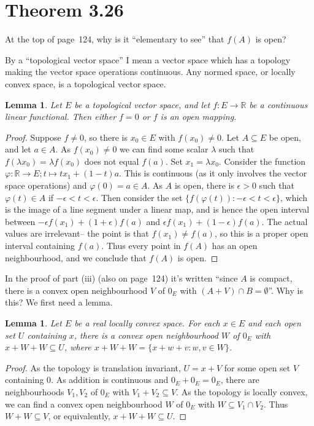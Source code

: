 \documentclass[twoside,12pt,a4paper]{article}
\theoremstyle{plain}
\newtheorem{lemma}[proposition]{Lemma}
\theoremstyle{definition}
\begin{document}

\section{Theorem 3.26}

At the top of page~124, why is it ``elementary to see'' that $f(A)$ is open?

By a ``topological vector space'' I mean a vector space which has a topology making
the vector space operations continuous.  Any normed space, or locally convex space,
is a topological vector space.

\begin{lemma}
Let $E$ be a topological vector space, and let $f:E\rightarrow\mathbb R$ be a
continuous linear functional.  Then either $f=0$ or $f$ is an open mapping.
\end{lemma}
\begin{proof}
Suppose $f\not=0$, so there is $x_0\in E$ with $f(x_0)\not=0$.
Let $A\subseteq E$ be open, and let $a\in A$.  As $f(x_0)\not=0$ we can
find some scalar $\lambda$ such that $f(\lambda x_0) = \lambda f(x_0)$ does
not equal $f(a)$.  Set $x_1=\lambda x_0$.  Consider the function
$\varphi:\mathbb R\rightarrow E; t\mapsto tx_1 +(1-t)a$.  This is continuous
(as it only involves the vector space operations) and $\varphi(0)=a\in A$.
As $A$ is open, there is $\epsilon>0$ such that $\varphi(t)\in A$ if
$-\epsilon < t <\epsilon$.  Then consider the set $\{ f(\varphi(t)) :
-\epsilon < t <\epsilon\}$, which is the image of a line segment under a linear
map, and is hence the open interval between $-\epsilon f(x_1) + (1+\epsilon)
f(a)$ and $\epsilon f(x_1) + (1-\epsilon) f(a)$.  The actual values are
irrelevant-- the point is that $f(x_1)\not=f(a)$, so this is a proper open
interval containing $f(a)$.  Thus every point in $f(A)$ has an open
neighbourhood, and we conclude that $f(A)$ is open.
\end{proof}

In the proof of part (iii) (also on page~124) it's written ``since $A$
is compact, there is a convex open neighbourhood $V$ of $0_E$ with $(A+V)
\cap B=\emptyset$''.  Why is this?  We first need a lemma.

\begin{lemma}
Let $E$ be a real locally convex space.  For each $x\in E$ and each
open set $U$ containing $x$, there is a convex open neighbourhood $W$ of
$0_E$ with $x+W+W \subseteq U$, where $x+W+W=\{ x+w+v : w,v\in W \}$.
\end{lemma}
\begin{proof}
As the topology is translation invariant, $U=x+V$ for some open set $V$
containing $0$.  As addition is continuous and $0_E+0_E=0_E$, there are
neighbourhoods $V_1,V_2$ of $0_E$ with $V_1+V_2 \subseteq V$.  As the
topology is locally convex, we can find a convex open neighbourhood $W$ of
$0_E$ with $W\subseteq V_1\cap V_2$.  Thus $W+W\subseteq V$, or equivalently,
$x+W+W \subseteq U$.
\end{proof}
\end{document}
